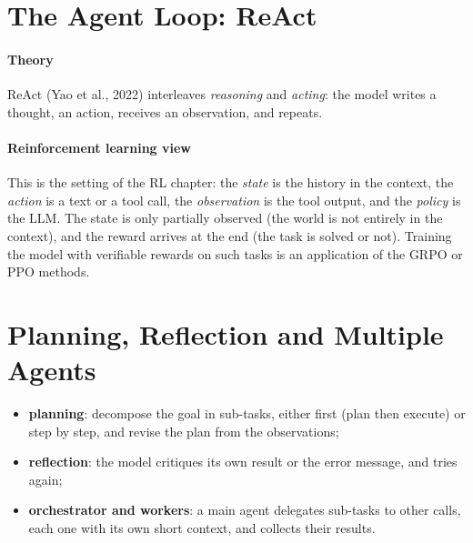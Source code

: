 \section{The Agent Loop: ReAct}
\paragraph{Theory}
ReAct (Yao et al., 2022) interleaves \emph{reasoning} and \emph{acting}: the model writes a
thought, an action, receives an observation, and repeats.
\begin{center}
\end{center}

\paragraph{Reinforcement learning view}
This is the setting of the RL chapter: the \emph{state} is the history in the context, the
\emph{action} is a text or a tool call, the \emph{observation} is the tool output, and the
\emph{policy} is the LLM. The state is only partially observed (the world is not entirely in
the context), and the reward arrives at the end (the task is solved or not). Training the
model with verifiable rewards on such tasks is an application of the GRPO or PPO methods.

\section{Planning, Reflection and Multiple Agents}
\begin{itemize}
    \item \textbf{planning}: decompose the goal in sub-tasks, either first (plan then
        execute) or step by step, and revise the plan from the observations;
    \item \textbf{reflection}: the model critiques its own result or the error message, and
        tries again;
    \item \textbf{orchestrator and workers}: a main agent delegates sub-tasks to other
        calls, each one with its own short context, and collects their results.
\end{itemize}

